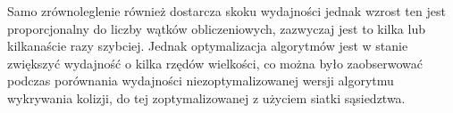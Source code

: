 \documentclass[12pt, letterpaper]{report}
\begin{document}
    Samo zrównoleglenie również dostarcza skoku wydajności jednak wzrost ten jest proporcjonalny do liczby wątków obliczeniowych,
    zazwyczaj jest to kilka lub kilkanaście razy szybciej. Jednak optymalizacja algorytmów jest w stanie 
    zwiększyć wydajność o kilka rzędów wielkości, co można było zaobserwować podczas porównania wydajności 
    niezoptymalizowanej wersji algorytmu wykrywania kolizji, do tej zoptymalizowanej z użyciem siatki sąsiedztwa.


    



\end{document}
